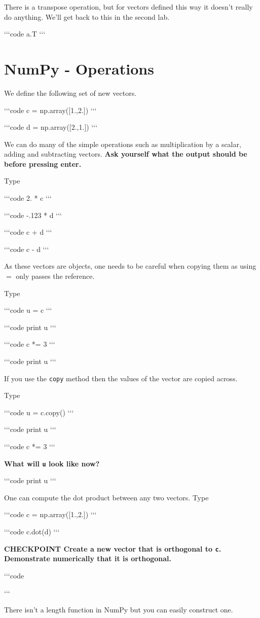 \documentclass[11pt]{amsart}
\newcommand{\cli}[1]{`{}`{}`{}code
#1 
`{}`{}`{}}
\newcommand{\checkpoint}[1]{{\bf CHECKPOINT \newline #1 \newline} 

`{}`{}`{}code
 
`{}`{}`{}
}
\begin{document}
 
There is a transpose operation, but for vectors defined this way it doesn't really do anything.  We'll get back to this in the second lab.  

\cli{a.T} 
  
    



\newpage

\section{NumPy - Operations}

We define the following set of new vectors.

\cli{c = np.array([1.,2.])} 

\cli{d = np.array([2.,1.])}

We can do many of the simple operations such as multiplication by a scalar, adding and subtracting vectors.  
{\bf Ask yourself what the output should be
before pressing enter.}

Type 

\cli{2. * c}

\cli{-.123 * d}

\cli{c + d}

\cli{c - d}


As these vectors are objects, one needs to be careful when copying them as using $=$  only passes the reference.

Type 

\cli{u = c}

\cli{print u} 

\cli{c *= 3}

\cli{print u}

If you use the {\tt copy} method then the values of the vector are copied across. 

Type 

\cli{u = c.copy()}

\cli{print u} 

\cli{c *= 3}

{\bf What will {\tt u} look like now?}

\cli{print u}

One can compute the dot product between any two vectors. 
Type 

\cli{c = np.array([1.,2.])} 

\cli{c.dot(d)}

\checkpoint{Create a new vector that is orthogonal to {\tt c}. Demonstrate numerically that it is orthogonal. }

There isn't a length function in NumPy but you can easily construct one.
\end{document}
